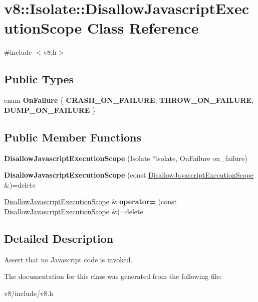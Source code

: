 \hypertarget{classv8_1_1Isolate_1_1DisallowJavascriptExecutionScope}{}\section{v8\+:\+:Isolate\+:\+:Disallow\+Javascript\+Execution\+Scope Class Reference}
\label{classv8_1_1Isolate_1_1DisallowJavascriptExecutionScope}


{\ttfamily \#include $<$v8.\+h$>$}

\subsection*{Public Types}
\begin{DoxyCompactItemize}
\item 
\mbox{\label{classv8_1_1Isolate_1_1DisallowJavascriptExecutionScope_aeb586bef085fba34f97c09afd07ea843}} 
enum {\bfseries On\+Failure} \{ {\bfseries C\+R\+A\+S\+H\+\_\+\+O\+N\+\_\+\+F\+A\+I\+L\+U\+RE}, 
{\bfseries T\+H\+R\+O\+W\+\_\+\+O\+N\+\_\+\+F\+A\+I\+L\+U\+RE}, 
{\bfseries D\+U\+M\+P\+\_\+\+O\+N\+\_\+\+F\+A\+I\+L\+U\+RE}
 \}
\end{DoxyCompactItemize}
\subsection*{Public Member Functions}
\begin{DoxyCompactItemize}
\item 
\mbox{\label{classv8_1_1Isolate_1_1DisallowJavascriptExecutionScope_a64813f7832ddca3014a7b98730a13948}} 
{\bfseries Disallow\+Javascript\+Execution\+Scope} (Isolate $\ast$isolate, On\+Failure on\+\_\+failure)
\item 
\mbox{\label{classv8_1_1Isolate_1_1DisallowJavascriptExecutionScope_a9a0c43b82fe8d0583b7af67af8aa5a33}} 
{\bfseries Disallow\+Javascript\+Execution\+Scope} (const \mbox{\hyperlink{classv8_1_1Isolate_1_1DisallowJavascriptExecutionScope}{Disallow\+Javascript\+Execution\+Scope}} \&)=delete
\item 
\mbox{\label{classv8_1_1Isolate_1_1DisallowJavascriptExecutionScope_a3cab43acfb1e7912dfeddd280750b912}} 
\mbox{\hyperlink{classv8_1_1Isolate_1_1DisallowJavascriptExecutionScope}{Disallow\+Javascript\+Execution\+Scope}} \& {\bfseries operator=} (const \mbox{\hyperlink{classv8_1_1Isolate_1_1DisallowJavascriptExecutionScope}{Disallow\+Javascript\+Execution\+Scope}} \&)=delete
\end{DoxyCompactItemize}


\subsection{Detailed Description}
Assert that no Javascript code is invoked. 

The documentation for this class was generated from the following file\+:\begin{DoxyCompactItemize}
\item 
v8/include/v8.\+h\end{DoxyCompactItemize}
